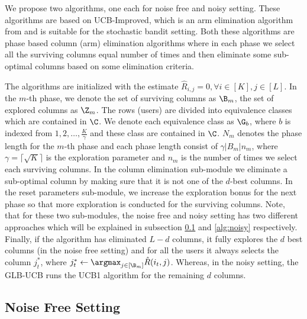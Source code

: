
We propose two algorithms, one each for noise free and noisy setting. These algorithms are based on UCB-Improved, which is an arm elimination algorithm from \citet{auer2010ucb} and is suitable for the stochastic bandit setting. Both these algorithms are phase based column (arm) elimination algorithms where in each phase we select all the surviving columns equal number of times  and then  eliminate some sub-optimal columns based on some elimination criteria. 

The algorithms are initialized with the estimate $\hat{R}_{i,j}=0, \forall i\in[K], j\in[L]$. In the $m$-th phase, we denote the set of surviving columns as $\B_m$, the set of explored columns as $\Z_m$. The rows (users) are divided into equivalence classes which are contained in $\C$. We denote each equivalence class as $\G_b$, where $b$ is indexed from $1,2,\ldots , \frac{K}{\gamma}$ and these class are contained in $\C$.  $N_m$ denotes the phase length for the $m$-th phase and each phase length consist of $\gamma |B_m| n_m $, where $ \gamma = \lceil\sqrt{K} \rceil $ is the exploration parameter and $ n_m $ is the number of times we select each surviving columns. In the column elimination sub-module we eliminate a sub-optimal column by making sure that it is not one of the $d$-best columns. In the reset parameters sub-module, we increase the exploration bonus for the next phase so that more exploration is conducted for the surviving columns. Note, that for these two sub-modules, the noise free and noisy setting has two different approaches which will be explained in subsection \ref{alg:noisefree} and \ref{alg:noisy} respectively. Finally, if the algorithm has eliminated $L-d$ columns, it fully explores the $d$ best columns (in the noise free setting) and for all the users it always selects the column $j^*_t$, where $j_t^* \leftarrow \argmax_{j\in[\B_m]} {\hat{R}(i_t,j)}$. Whereas, in the noisy setting, the GLB-UCB runs the UCB1 algorithm for the remaining $d$ columns.

\subsection{Noise Free Setting}
\label{alg:noisefree}

